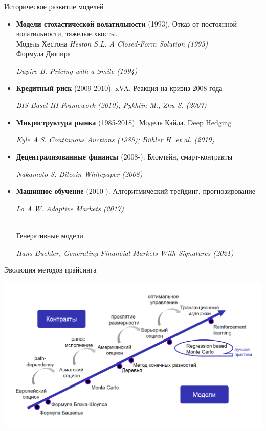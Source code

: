 \documentclass{beamer}
\begin{document}
\begin{frame}{Историческое развитие моделей}
\footnotesize
\begin{itemize}


\item \textbf{Модели стохастической волатильности} (1993). Отказ от постоянной волатильности, тяжелые хвосты. \\
Модель Хестона \scriptsize{\textit{Heston S.L. A Closed-Form Solution (1993)}}
\\Формула Дюпира 
\begin{scriptsize}{\textit{Dupire B. Pricing with a Smile (1994)}}\end{scriptsize}

\item \textbf{Кредитный риск} (2009-2010). xVA. Реакция на кризиз 2008 года \\
\begin{scriptsize}{\textit{BIS Basel III Framework (2010); Pykhtin M., Zhu S. (2007)}}\end{scriptsize}

\item \textbf{Микроструктура рынка} (1985-2018). Модель Кайла. Deep Hedging \\
\begin{scriptsize}{\textit{Kyle A.S. Continuous Auctions (1985); Bühler H. et al. (2019)}}\end{scriptsize}

\item \textbf{Децентрализованные финансы} (2008-). Блокчейн, смарт-контракты \\
\begin{scriptsize}{\textit{Nakamoto S. Bitcoin Whitepaper (2008)}}\end{scriptsize}

\item \textbf{Машинное обучение} (2010-). Алгоритмический трейдинг, прогнозирование 
\begin{scriptsize}{\textit{Lo A.W. Adaptive Markets (2017)}}\end{scriptsize}
\\ Генеративные модели
\begin{scriptsize} \textit{Hans Buehler, Generating Financial Markets With Signatures (2021)} \end{scriptsize}
\end{itemize}
\end{frame}

\begin{frame}{Эволюция методов прайсинга}
    \begin{center}
        \includegraphics[width=1.0\textwidth]{0_figs/стрелочка.png}
    \end{center}
\end{frame}
\end{document}
